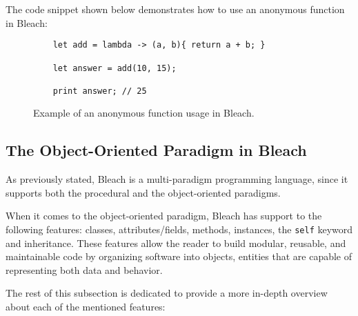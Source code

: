 The code snippet shown below demonstrates how to use an anonymous function in Bleach:

\begin{figure}[H]
    \centering
    \begin{lstlisting}
    let add = lambda -> (a, b){ return a + b; }
    
    let answer = add(10, 15);
    
    print answer; // 25
    \end{lstlisting}
    \caption{Example of an anonymous function usage in Bleach.}
\end{figure}


\subsection{The Object-Oriented Paradigm in Bleach}
As previously stated, Bleach is a multi-paradigm programming language, since it supports both the procedural and the object-oriented paradigms.

When it comes to the object-oriented paradigm, Bleach has support to the following features: classes, attributes/fields, methods, instances, the \texttt{self} keyword and inheritance. These features allow the reader to build modular, reusable, and maintainable code by organizing software into objects, entities that are capable of representing both data and behavior.

The rest of this subsection is dedicated to provide a more in-depth overview about each of the mentioned features:

